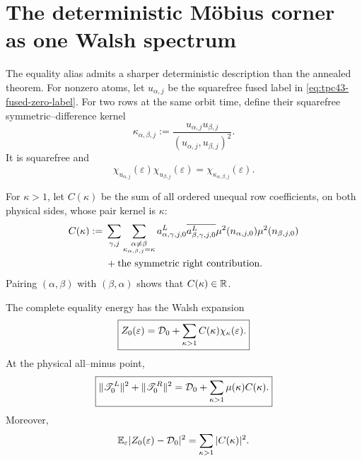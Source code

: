 \section{The deterministic M\"obius corner as one Walsh spectrum}
\label{sec:tpc43-Walsh-corner}

The equality alias admits a sharper deterministic description than the
annealed theorem.  For nonzero atoms, let
\(u_{\alpha,j}\) be the squarefree fused label in
\eqref{eq:tpc43-fused-zero-label}.  For two rows at the same orbit time,
define their squarefree symmetric--difference kernel
\begin{equation}
 \kappa_{\alpha,\beta,j}
 :=\frac{u_{\alpha,j}u_{\beta,j}}
 {(u_{\alpha,j},u_{\beta,j})^2}.
 \label{eq:tpc43-pair-kernel}
\end{equation}
It is squarefree and
\begin{equation}
 \chi_{u_{\alpha,j}}(\varepsilon)
 \chi_{u_{\beta,j}}(\varepsilon)
 =\chi_{\kappa_{\alpha,\beta,j}}(\varepsilon).
 \label{eq:tpc43-pair-character}
\end{equation}

For \(\kappa>1\), let \(C(\kappa)\) be the sum of all ordered unequal
row coefficients, on both physical sides, whose pair kernel is
\(\kappa\):
\begin{align}
 C(\kappa)
 :={}&\sum_{\gamma,j}
 \sum_{\substack{\alpha\ne\beta\\
 \kappa_{\alpha,\beta,j}=\kappa}}
 a^L_{\alpha,\gamma,j,0}
 \overline{a^L_{\beta,\gamma,j,0}}
 \mu^2(n_{\alpha,j,0})\mu^2(n_{\beta,j,0})
 \notag\\
 &+\text{the symmetric right contribution}.
 \label{eq:tpc43-Walsh-spectrum-coefficient}
\end{align}
Pairing \((\alpha,\beta)\) with \((\beta,\alpha)\) shows that
\(C(\kappa)\in\mathbb R\).

\begin{theorem}
\label{thm:tpc43-four-to-one-compression}
The complete equality energy has the Walsh expansion
\begin{equation}
 \boxed{
 Z_0(\varepsilon)
 =\mathcal D_0+
  \sum_{\kappa>1}C(\kappa)\chi_\kappa(\varepsilon).}
 \label{eq:tpc43-exact-Walsh-expansion}
\end{equation}
At the physical all--minus point,
\begin{equation}
 \boxed{
 \|\mathscr T_0^L\|^2+\|\mathscr T_0^R\|^2
 =\mathcal D_0+
  \sum_{\kappa>1}\mu(\kappa)C(\kappa).}
 \label{eq:tpc43-physical-kernel-spectrum}
\end{equation}
Moreover,
\begin{equation}
 \mathbb E_\varepsilon
 |Z_0(\varepsilon)-\mathcal D_0|^2
 =\sum_{\kappa>1}|C(\kappa)|^2.
 \label{eq:tpc43-Walsh-Parseval}
\end{equation}
\end{theorem}

